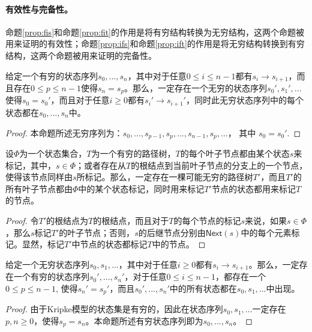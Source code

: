 \paragraph{有效性与完备性。}\label{sound:complete}
命题\ref{prop:fis}和命题\ref{prop:fit}的作用是将有穷结构转换为无穷结构，这两个命题被用来证明\SCTL{}的有效性；命题\ref{prop:ifs}和命题\ref{prop:ift}的作用是将无穷结构转换到有穷结构，这两个命题被用来证明\SCTL{}的完备性。

\begin{proposition} [有穷状态序列到无穷状态序列]\label{prop:fis}
	给定一个有穷的状态序列$s_0,...,s_n$，其中对于任意$0\le i\le n-1$都有$s_i\longrightarrow s_{i+1}$，而且存在$0\le p \le n-1$使得$s_n=s_p$。那么，一定存在一个无穷的状态序列$s_0',s_1',...$使得$s_0 = s_0'$，而且对于任意$i\ge 0$都有$s_i'\longrightarrow
	s_{i+1}'$，同时此无穷状态序列中的每个状态都在$s_0,...,s_n$中。
\end{proposition}
\begin{proof}
	本命题所述无穷序列为：$s_0,...,s_{p-1},s_p,...,s_{n-1},s_p,...$， 其中 $s_0 = s_0'$.
\end{proof}

\begin{proposition}[有穷路径树到无穷路径树]\label{prop:fit}
	设$\Phi$为一个状态集合，$T$为一个有穷的路径树，$T$的每个叶子节点都由某个状态$s$来标记，其中，$s\in \Phi$；或者存在从$T$的根结点到当前叶子节点的分支上的一个节点，使得该节点同样由$s$所标记。那么，一定存在一棵可能无穷的路径树$T'$，而且$T'$的所有叶子节点都由$\Phi$中的某个状态标记，同时用来标记$T'$节点的状态都用来标记$T$的节点。
\end{proposition}
\begin{proof}
	令$T'$的根结点为$T$的根结点，而且对于$T$的每个节点的标记$s$来说，如果$s\in\Phi$，那么$s$标记$T'$的叶子节点；否则，$s$的后继节点分别由$\mathsf{Next}(s)$中的每个元素标记。显然，标记$T'$中节点的状态都标记$T$中的节点。
\end{proof}


\begin{proposition} [无穷状态序列到有穷状态序列]\label{prop:ifs}
	给定一个无穷状态序列$s_0,s_1,...$，其中对于任意$i\ge 0$都有$s_i\longrightarrow s_{i+1}$。那么，一定存在一个有穷的状态序列$s_0',...,s_n'$，对于任意$0\le i\le n-1$，都存在一个$0\le p\le n-1$, 使得$s_n'=s_p'$，而且$s_0',...,s_n'$中的所有状态都在$s_0,s_1,...$中出现。
\end{proposition}
\begin{proof}
	由于Kripke模型的状态集是有穷的，因此在状态序列$s_0,s_1,...$一定存在$p, n\ge 0$，使得$s_p=s_n$。本命题所述有穷状态序列即为$s_0,...,s_n$。
\end{proof}

